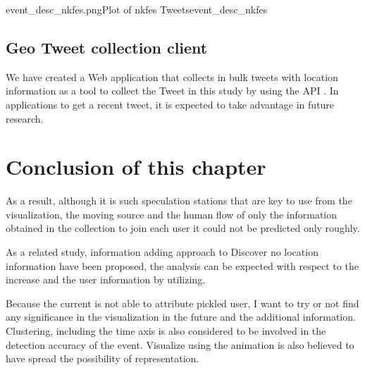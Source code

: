 {event_desc_nkfes.png}{Plot of nkfes Tweets}{event_desc_nkfes}

\subsection{Geo Tweet collection client}
We have created a Web application that collects in bulk tweets with location information as a tool to collect the Tweet in this study by using the API .
In applications to get a recent tweet, it is expected to take advantage in future research.


\newpage

\section{Conclusion of this chapter}

As a result, although it is such speculation stations that are key to use from the visualization, the moving source and the human flow of only the information obtained in the collection to join each user it could not be predicted only roughly.

As a related study, information adding approach to Discover no location information have been proposed\cite{twitterlocalevent}, the analysis can be expected with respect to the increase and the user information by utilizing.

Because the current is not able to attribute pickled user, I want to try or not find any significance in the visualization in the future and the additional information.
Clustering, including the time axis is also considered to be involved in the detection accuracy of the event. Visualize using the animation is also believed to have spread the possibility of representation.

\newpage
